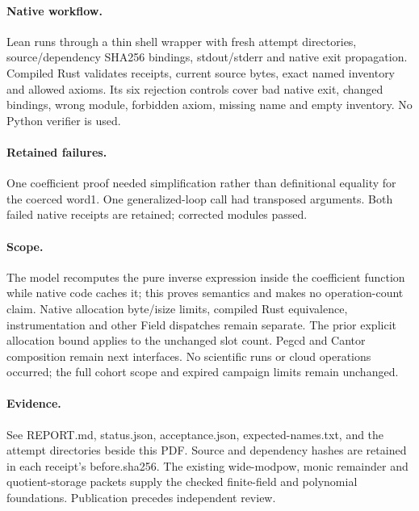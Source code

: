 \documentclass[10pt]{article}
\begin{document}
\paragraph{Native workflow.}
Lean runs through a thin shell wrapper with fresh attempt directories, source/dependency SHA256 bindings, stdout/stderr and native exit propagation. Compiled Rust validates receipts, current source bytes, exact named inventory and allowed axioms. Its six rejection controls cover bad native exit, changed bindings, wrong module, forbidden axiom, missing name and empty inventory. No Python verifier is used.

\paragraph{Retained failures.}
One coefficient proof needed simplification rather than definitional equality for the coerced word1. One generalized-loop call had transposed arguments. Both failed native receipts are retained; corrected modules passed.

\paragraph{Scope.}
The model recomputes the pure inverse expression inside the coefficient function while native code caches it; this proves semantics and makes no operation-count claim. Native allocation byte/isize limits, compiled Rust equivalence, instrumentation and other Field dispatches remain separate. The prior explicit allocation bound applies to the unchanged slot count. Pegcd and Cantor composition remain next interfaces. No scientific runs or cloud operations occurred; the full cohort scope and expired campaign limits remain unchanged.

\paragraph{Evidence.}
See REPORT.md, status.json, acceptance.json, expected-names.txt, and the attempt directories beside this PDF. Source and dependency hashes are retained in each receipt's before.sha256. The existing wide-modpow, monic remainder and quotient-storage packets supply the checked finite-field and polynomial foundations. Publication precedes independent review.
\end{document}
